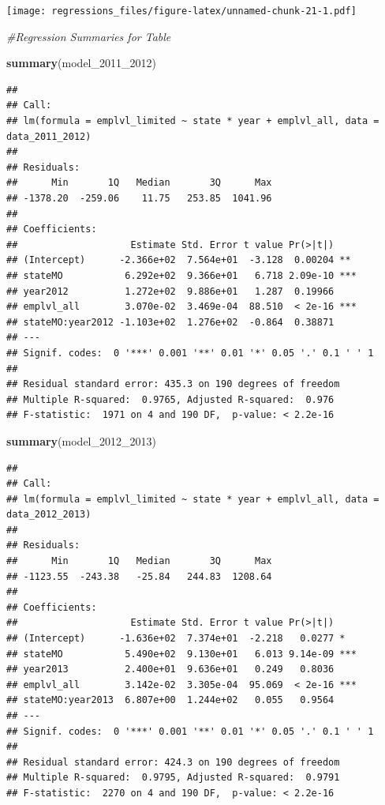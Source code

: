 \documentclass[
]{article}
\newenvironment{Shaded}{\begin{snugshade}}{\end{snugshade}}
\newcommand{\CommentTok}[1]{\textcolor[rgb]{0.56,0.35,0.01}{\textit{#1}}}
\newcommand{\FunctionTok}[1]{\textcolor[rgb]{0.13,0.29,0.53}{\textbf{#1}}}
\newcommand{\NormalTok}[1]{#1}
\begin{document}
\texttt{[image: regressions\_files/figure-latex/unnamed-chunk-21-1.pdf]}

\begin{Shaded}
\begin{Highlighting}[]
\CommentTok{\#Regression Summaries for Table}

\FunctionTok{summary}\NormalTok{(model\_2011\_2012)}
\end{Highlighting}
\end{Shaded}

\begin{verbatim}
## 
## Call:
## lm(formula = emplvl_limited ~ state * year + emplvl_all, data = data_2011_2012)
## 
## Residuals:
##      Min       1Q   Median       3Q      Max 
## -1378.20  -259.06    11.75   253.85  1041.96 
## 
## Coefficients:
##                    Estimate Std. Error t value Pr(>|t|)    
## (Intercept)      -2.366e+02  7.564e+01  -3.128  0.00204 ** 
## stateMO           6.292e+02  9.366e+01   6.718 2.09e-10 ***
## year2012          1.272e+02  9.886e+01   1.287  0.19966    
## emplvl_all        3.070e-02  3.469e-04  88.510  < 2e-16 ***
## stateMO:year2012 -1.103e+02  1.276e+02  -0.864  0.38871    
## ---
## Signif. codes:  0 '***' 0.001 '**' 0.01 '*' 0.05 '.' 0.1 ' ' 1
## 
## Residual standard error: 435.3 on 190 degrees of freedom
## Multiple R-squared:  0.9765, Adjusted R-squared:  0.976 
## F-statistic:  1971 on 4 and 190 DF,  p-value: < 2.2e-16
\end{verbatim}

\begin{Shaded}
\begin{Highlighting}[]
\FunctionTok{summary}\NormalTok{(model\_2012\_2013)}
\end{Highlighting}
\end{Shaded}

\begin{verbatim}
## 
## Call:
## lm(formula = emplvl_limited ~ state * year + emplvl_all, data = data_2012_2013)
## 
## Residuals:
##      Min       1Q   Median       3Q      Max 
## -1123.55  -243.38   -25.84   244.83  1208.64 
## 
## Coefficients:
##                    Estimate Std. Error t value Pr(>|t|)    
## (Intercept)      -1.636e+02  7.374e+01  -2.218   0.0277 *  
## stateMO           5.490e+02  9.130e+01   6.013 9.14e-09 ***
## year2013          2.400e+01  9.636e+01   0.249   0.8036    
## emplvl_all        3.142e-02  3.305e-04  95.069  < 2e-16 ***
## stateMO:year2013  6.807e+00  1.244e+02   0.055   0.9564    
## ---
## Signif. codes:  0 '***' 0.001 '**' 0.01 '*' 0.05 '.' 0.1 ' ' 1
## 
## Residual standard error: 424.3 on 190 degrees of freedom
## Multiple R-squared:  0.9795, Adjusted R-squared:  0.9791 
## F-statistic:  2270 on 4 and 190 DF,  p-value: < 2.2e-16
\end{verbatim}
\end{document}
